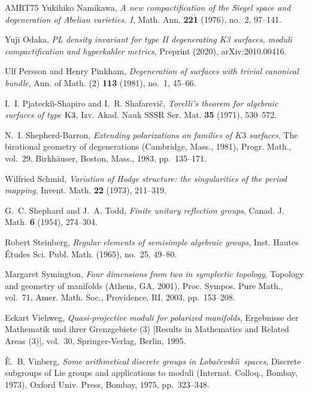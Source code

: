 \documentclass[table,x11names]{amsart}
\begin{document}
\begin{thebibliography}{AMRT75}
Yukihiko Namikawa, \emph{{A} new compactification of the {S}iegel space and
  degeneration of {A}belian varieties. {I}}, Math. Ann. \textbf{221} (1976),
  no.~2, 97--141. 

Yuji Odaka, \emph{{PL} density invariant for type {II} degenerating {K3}
  surfaces, moduli compactification and hyperkahler metrics}, Preprint (2020),
  arXiv:2010.00416.

Ulf Persson and Henry Pinkham, \emph{Degeneration of surfaces with trivial
  canonical bundle}, Ann. of Math. (2) \textbf{113} (1981), no.~1, 45--66.

I.~I. Pjatecki\u{\i}-Shapiro and I.~R. Shafarevi\v{c}, \emph{Torelli's theorem
  for algebraic surfaces of type {${\rm K}3$}}, Izv. Akad. Nauk SSSR Ser. Mat.
  \textbf{35} (1971), 530--572. 

N.~I. Shepherd-Barron, \emph{Extending polarizations on families of {$K3$}
  surfaces}, The birational geometry of degenerations ({C}ambridge, {M}ass.,
  1981), Progr. Math., vol.~29, Birkh\"{a}user, Boston, Mass., 1983,
  pp.~135--171. 

Wilfried Schmid, \emph{Variation of {H}odge structure: the singularities of the
  period mapping}, Invent. Math. \textbf{22} (1973), 211--319. 

G.~C. Shephard and J.~A. Todd, \emph{Finite unitary reflection groups}, Canad.
  J. Math. \textbf{6} (1954), 274--304. 

Robert Steinberg, \emph{Regular elements of semisimple algebraic groups}, Inst.
  Hautes \'{E}tudes Sci. Publ. Math. (1965), no.~25, 49--80. 

Margaret Symington, \emph{Four dimensions from two in symplectic topology},
  Topology and geometry of manifolds ({A}thens, {GA}, 2001), Proc. Sympos. Pure
  Math., vol.~71, Amer. Math. Soc., Providence, RI, 2003, pp.~153--208.

Eckart Viehweg, \emph{{Q}uasi-projective moduli for polarized manifolds},
  Ergebnisse der Mathematik und ihrer Grenzgebiete (3) [Results in Mathematics
  and Related Areas (3)], vol.~30, Springer-Verlag, Berlin, 1995. 

{\`E}.~B. Vinberg, \emph{Some arithmetical discrete groups in {L}oba\v
  cevski\u\i\ spaces}, Discrete subgroups of {L}ie groups and applications to
  moduli ({I}nternat. {C}olloq., {B}ombay, 1973), Oxford Univ. Press, Bombay,
  1975, pp.~323--348. 

\end{thebibliography}
\end{document}
